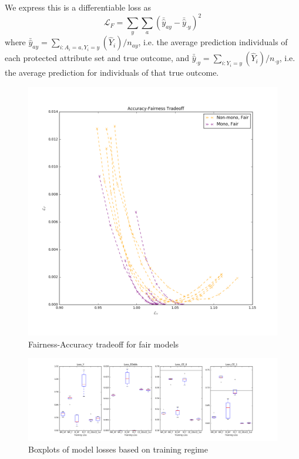         We express this is a differentiable loss as 
        $$
            \mathcal{L}_F = \sum\limits_{y} \sum\limits_{a} \left( \bar{\hat{y}}_{ay} - \bar{\hat{y}}_{\cdot y} \right)^2
        $$
        where $\bar{\hat{y}}_{ay} = \sum_{i: A_i = a, Y_i = y}(\hat{Y}_i) / n_{ay}$, i.e. the average prediction individuals of each protected attribute set and true outcome, and $\bar{\hat{y}}_{\cdot y} = \sum_{i: Y_i = y}(\hat{Y}_i) / n_{\cdot y}$, i.e. the average prediction for individuals of that true outcome.
        
        \begin{figure}
            \centering
            \includegraphics[width=\textwidth]{fig_softmono/compas_tradeoffs_fair.png}
            \caption{Fairness-Accuracy tradeoff for fair models}
            \label{fig:sm_compas_tradeoffs}
        \end{figure}
        
        \begin{figure}
            \centering
            \includegraphics[width=\textwidth]{fig_softmono/compas_boxplot.png}
            \caption{Boxplots of model losses based on training regime}
            \label{fig:sm_compas_boxplots}
        \end{figure}
        

    

